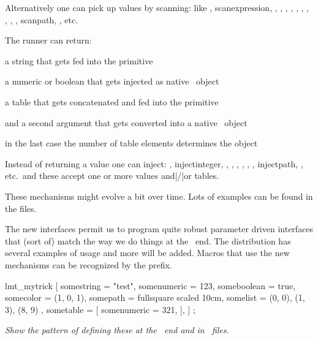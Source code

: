 Alternatively one can pick up values by scanning: like , \type
{scanexpression}, , , ,
, , , ,
, , , \type
{scanpath}, , etc.

\stoptitle

\starttitle[title=Return values]

The runner can return:

\startitemize

\startitem
    a string that gets fed into the  primitive
\stopitem

\startitem
    a numeric or boolean that gets injected as native \METAPOST\ object
\stopitem

\startitem
    a table that gets concatenated and fed into the  primitive
\stopitem

\startitem
     and a second argument that gets converted into a native \METAPOST\ object
\stopitem

\startitem
    in the last case the number of table elements determines the object
\stopitem

\stopitemize

Instead of returning a value one can inject: , \type
{injectinteger}, , , ,
, , , \type
{injectpath}, , etc.\ and these accept one or more values
and|/|or tables.

These mechanisms might evolve a bit over time. Lots of examples can be found in
the  files.

\stoptitle

\starttitle[title=Parameters]

\startitemize
    \startitem
        The new interfaces permit us to program quite robust parameter driven
        interfaces that (sort of) match the way we do things at the \TEX\ end.
    \stopitem
    \startitem
        The distribution has several examples of usage and more will be added.
    \stopitem
    \startitem
        Macros that use the new mechanisms can be recognized by the 
        prefix.
    \stopitem
\stopitemize

\starttyping
lmt_mytrick [
    somestring  = "test",
    somenumeric = 123,
    someboolean = true,
    somecolor   = (1, 0, 1),
    somepath    = fullsquare scaled 10cm,
    somelist    = { (0, 0), (1, 3), (8, 9) },
    sometable   = [
        somenumeric = 321,
   ],
] ;
\stoptyping

{\em Show the pattern of defining these at the \LUA\ end and in \METAPOST\ files.}

\stoptitle

\stopdocument
